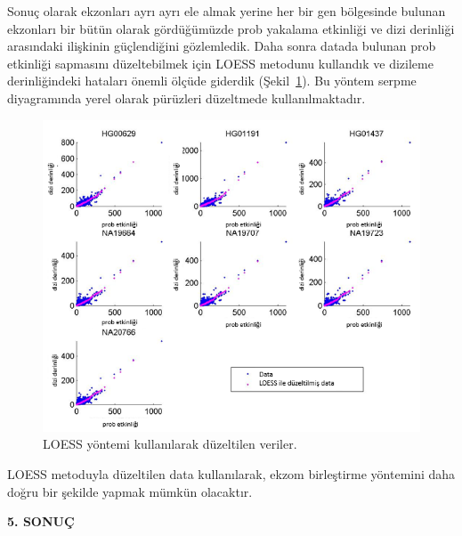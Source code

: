 \documentclass[11pt]{article}
\begin{document}
  Sonuç olarak ekzonları ayrı ayrı ele almak yerine her bir gen bölgesinde bulunan ekzonları bir bütün olarak gördüğümüzde prob yakalama etkinliği ve dizi derinliği arasındaki ilişkinin güçlendiğini gözlemledik. Daha sonra datada bulunan prob etkinliği sapmasını düzeltebilmek için LOESS metodunu kullandık ve dizileme derinliğindeki hataları önemli ölçüde giderdik (Şekil~\ref{fig:captureeffloess}). Bu yöntem serpme diyagramında yerel olarak pürüzleri düzeltmede kullanılmaktadır.


\begin{figure}[htb]
\begin{center}
  \includegraphics[scale=0.65]{captureeff-loess.png}
\end{center}
\caption{LOESS yöntemi kullanılarak düzeltilen veriler.}
\label{fig:captureeffloess}
\end{figure}

LOESS metoduyla düzeltilen data kullanılarak, ekzom birleştirme yöntemini daha doğru bir şekilde yapmak mümkün olacaktır.

\clearpage

\begin{center}
{\bf \Large 5. SONUÇ}
\end{center}
\end{document}
